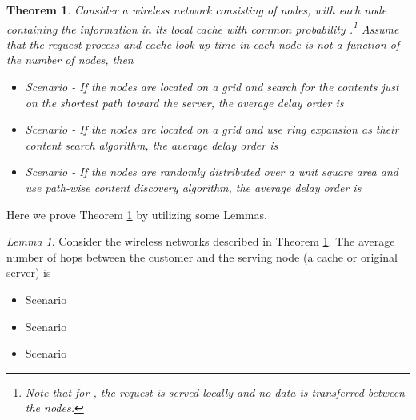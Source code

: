 \documentclass[journal]{IEEEtran}
\theoremstyle{plain}
\newtheorem{theorem}{Theorem}
\theoremstyle{remark}
\newtheorem{lemma}{Lemma}
\begin{document}
\begin{theorem} \label{thm:02}
	Consider a wireless network consisting of  nodes, with each node containing the information in its local cache with common probability .\footnote{Note that for , the request is served locally and no data is transferred between the nodes.} Assume that the request process and cache look up time in each node is not a function of the number of nodes, then
	
	\begin{itemize}
		\item Scenario - If the nodes are located on a grid and search for the contents just on the shortest path toward the server, the average delay order is
		
		
		
		\item Scenario - If the nodes are located on a grid and use ring expansion as their content search algorithm, the average delay order is
				
		
		\item Scenario - If the nodes are randomly distributed over a unit square area and use path-wise content discovery algorithm, the average delay order is 	
		
		
		\end{itemize}
\end{theorem}

Here we prove Theorem \ref{thm:02} by utilizing some Lemmas.

\begin{lemma} \label{lem:01}
	Consider the wireless networks described in Theorem \ref{thm:02}. The average number of hops between the customer and the serving node (a cache or original server) is 
	
		\begin{itemize}
		\item Scenario 
			

		\item Scenario 
		
		
		
		\item Scenario 
		
		
	
		\end{itemize}
	\end{lemma}
	
\end{document}
